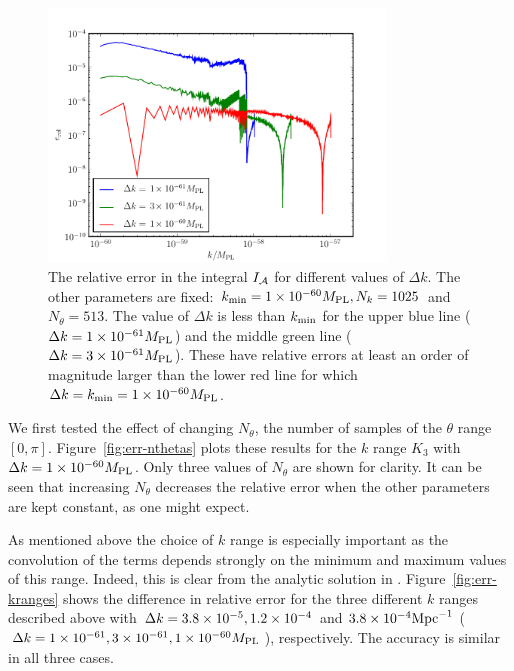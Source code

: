 \begin{figure}[htbp]
 \centering
 \includegraphics[width=0.8\textwidth]{numerical/graphs/err_deltaks-large}
 \caption[Relative error in the integral $I_\A$]{The relative error in the
integral $I_\A$ for different values of $\Delta k$.
The other parameters are fixed: $k_{\mathrm{min}}=1\times10^{-60}M_{\mathrm{PL}}, N_k = 1025$ and
$N_\theta=513$. 
The value of $\Delta k$ is less than $k_{\mathrm{min}}$ for the upper 
blue line ($\Delta k=1\times 10^{-61}M_{\mathrm{PL}}$) and the middle green line ($\Delta
k=3\times 10^{-61}M_{\mathrm{PL}}$). These have relative errors at least an order of magnitude larger
than the lower red line for which $\Delta k=k_{\mathrm{min}}=1\times 10^{-60}M_{\mathrm{PL}}$.}
 \label{fig:err-deltaks}
\end{figure}


We first tested the effect of changing $N_\theta$, the number of
samples of the $\theta$ range $[0,\pi]$.  Figure~\ref{fig:err-nthetas}
plots these results for the $k$ range $K_3$ with $\Delta k =
1\times 10^{-60}M_{\mathrm{PL}}$. Only three values of $N_\theta$ are shown for clarity. It
can be seen that increasing $N_\theta$ decreases the relative error when the other
parameters are kept constant, as one
might expect.


As mentioned above the choice of $k$ range is especially important as
the convolution of the terms depends strongly on the minimum and
maximum values of this range. Indeed, this is clear from the analytic
solution in . Figure~\ref{fig:err-kranges}
shows the difference in relative error for the three different $k$
ranges described above with 
$\Delta k= 3.8\times 10^{-5}, 1.2\times 10^{-4}$ and $3.8\times 10^{-4}\mathrm{Mpc}^{-1}$
($\Delta k= 1\times 10^{-61}, 3\times 10^{-61},1\times 10^{-60}M_{\mathrm{PL}}$),
respectively. The accuracy is similar in all three cases.


